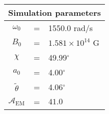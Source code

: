\begin{tabular}{ccl}
\multicolumn{3}{c}{Simulation parameters} \\
\hline
$\omega_0$  &=& 1550.0 rad/s\\
$B_0$  &=& ${1.581}\times 10^{14}$ G \\
$\chi$  &=& 49.99$^{\circ}$ \\
$a_0$ &=& 4.00$^{\circ}$ \\
$\tilde{\theta}$ &= & 4.06$^{\circ}$ \\
$\mathcal{A}_{\mathrm{EM}}$ &= & $41.0$
\end{tabular}